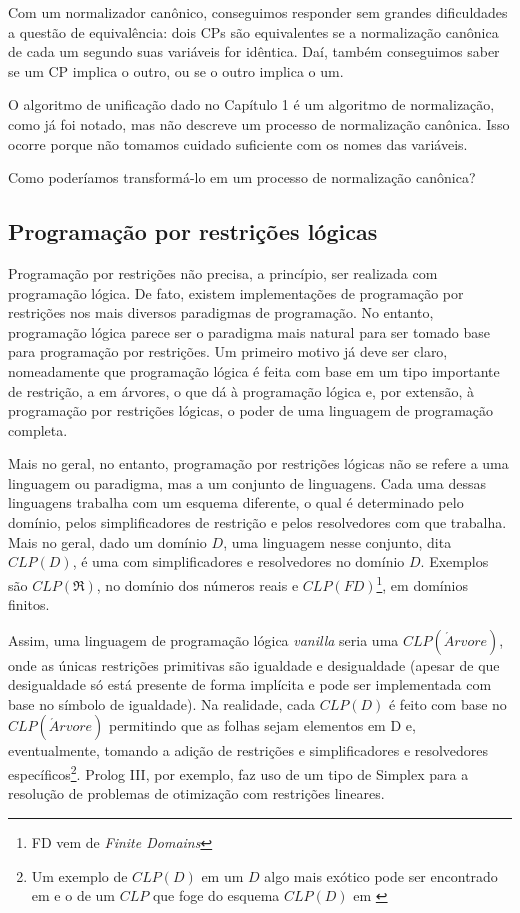 \documentclass{article}
\theoremstyle{remark}
\theoremstyle{theorem}
\begin{document}
  Com um normalizador canônico, conseguimos responder sem grandes dificuldades a questão de equivalência: dois CPs são equivalentes se a normalização canônica de cada um segundo suas variáveis for idêntica. Daí, também conseguimos saber se um CP implica o outro, ou se o outro implica o um.

  O algoritmo de unificação dado no Capítulo 1 %
é um algoritmo de normalização, como já foi notado, mas não descreve um processo de normalização canônica. Isso ocorre porque não tomamos cuidado suficiente com os nomes das variáveis.

Como poderíamos transformá-lo em um processo de normalização canônica?

\subsection{Programação por restrições lógicas}

Programação por restrições não precisa, a princípio, ser realizada com programação lógica. De fato, existem implementações de
programação por restrições nos mais diversos paradigmas de programação. No entanto, programação lógica parece ser o paradigma mais natural
para ser tomado base para programação por restrições. Um primeiro motivo já deve ser claro, nomeadamente que programação lógica é feita com base em um tipo importante de restrição, a em árvores, o que dá à programação lógica e, por extensão, à programação
por restrições lógicas, o poder de uma linguagem de programação completa.

Mais no geral, no entanto, programação por restrições lógicas não se refere a uma linguagem ou paradigma, mas a um conjunto
de linguagens. Cada uma dessas linguagens trabalha com um esquema diferente, o qual é determinado pelo domínio,
pelos simplificadores de restrição e pelos resolvedores com que trabalha. Mais no geral, dado um domínio $D$,
uma linguagem nesse conjunto, dita $CLP(D)$, é uma com simplificadores e resolvedores no domínio $D$.
Exemplos são $CLP(\Re)$, no domínio dos números reais e $CLP(FD)$\footnote{FD vem de \textit{Finite Domains}}, em domínios finitos.

Assim, uma linguagem de programação lógica \textit{vanilla} seria uma $CLP(\acute{A}rvore)$, onde as únicas restrições primitivas são igualdade e desigualdade (apesar de que desigualdade só está presente de forma implícita e pode ser implementada com base no símbolo de igualdade).
Na realidade, cada $CLP(D)$ é feito com base no $CLP(\acute{A}rvore)$ permitindo que as folhas sejam elementos em D e, eventualmente, tomando a adição de restrições e simplificadores e resolvedores específicos\footnote{Um exemplo de $CLP(D)$ em um $D$ algo mais exótico pode ser encontrado em \cite{besik} e o de um $CLP$ que foge do esquema $CLP(D)$ em \cite{margarida}}. Prolog III, por exemplo, faz uso de um tipo de Simplex para a resolução
de problemas de otimização com restrições lineares.
\end{document}
